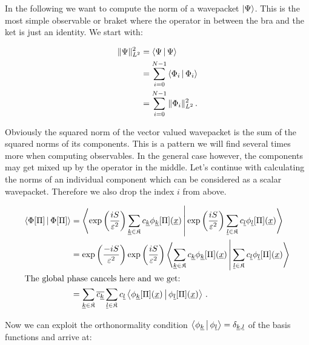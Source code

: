 In the following we want to compute the norm of a wavepacket $\Ket{\Psi}$.
This is the most simple observable or braket where the operator in between
the bra and the ket is just an identity. We start with:

\begin{align*}
  \|\Psi\|^2_{L^2} & = \Braket{\Psi | \Psi} \\
                   & = \sum_{i=0}^{N-1} \Braket{\Phi_i | \Phi_i} \\
                   & = \sum_{i=0}^{N-1} \| \Phi_i \|^2_{L^2} \,.
\end{align*}

Obviously the squared norm of the vector valued wavepacket is the sum of the
squared norms of its components. This is a pattern we will find several times more
when computing observables. In the general case however, the components may get
mixed up by the operator in the middle. Let's continue with calculating the norms
of an individual component which can be considered as a scalar wavepacket. Therefore
we also drop the index $i$ from above.

\begin{align*}
  \Braket{\Phi[\Pi] | \Phi[\Pi]} & = \Braket{ \exp\left(\frac{i S}{\varepsilon^2}\right)
                                              \sum_{\underline{k}\in\mathfrak{K}} c_{\underline{k}} \phi_{\underline{k}}[\Pi](\underline{x})
                                              |
                                              \exp\left(\frac{i S}{\varepsilon^2}\right)
                                              \sum_{\underline{l}\in\mathfrak{K}} c_{\underline{l}} \phi_{\underline{l}}[\Pi](\underline{x})
                                              } \\
  & = \exp\left(\frac{-i S}{\varepsilon^2}\right)\exp\left(\frac{i S}{\varepsilon^2}\right)
      \Braket{ \sum_{\underline{k}\in\mathfrak{K}} c_{\underline{k}} \phi_{\underline{k}}[\Pi](\underline{x})
               |
               \sum_{\underline{l}\in\mathfrak{K}} c_{\underline{l}} \phi_{\underline{l}}[\Pi](\underline{x})
             } \\
\intertext{The global phase cancels here and we get:}
  & = \sum_{\underline{k}\in\mathfrak{K}} \overline{c_{\underline{k}}} \sum_{\underline{l}\in\mathfrak{K}} c_{\underline{l}}
      \Braket{ \phi_{\underline{k}}[\Pi](\underline{x}) | \phi_{\underline{l}}[\Pi](\underline{x}) } \,.
\end{align*}

Now we can exploit the orthonormality condition $\Braket{ \phi_{\underline{k}} | \phi_{\underline{l}} } = \delta_{\underline{k},\underline{l}}$
of the basis functions and arrive at:


